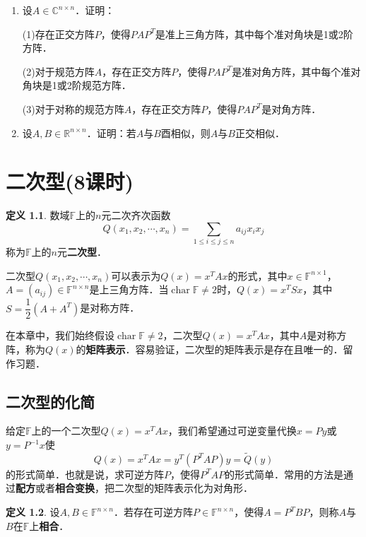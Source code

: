 \documentclass[a4paper,fontset=windows]{ctexbook}
\theoremstyle{definition}
\newtheorem{definition}{定义}[chapter]
\DeclareMathOperator{\Char}{char}
\renewcommand{\le}{\leqslant}
\begin{document}
\begin{enumerate}
\item 设$A\in\mathbb{C}^{n\times n}$．证明：

(1)存在正交方阵$P$，使得$PAP^T$是准上三角方阵，其中每个准对角块是1或2阶方阵．

(2)对于规范方阵$A$，存在正交方阵$P$，使得$PAP^T$是准对角方阵，其中每个准对角块是1或2阶规范方阵．

(3)对于对称的规范方阵$A$，存在正交方阵$P$，使得$PAP^T$是对角方阵．

\item 设$A,B\in\mathbb{R}^{n\times n}$．证明：若$A$与$B$酉相似，则$A$与$B$正交相似．

\end{enumerate}

\clearpage{}%

\chapter{二次型(8课时)}%

\begin{definition}
数域$\mathbb{F}$上的$n$元二次齐次函数
$$Q(x_1,x_2,\cdots,x_n)=\sum_{1\le i\le j\le n}a_{ij}x_ix_j$$
称为$\mathbb{F}$上的$n$元{\bf 二次型}．
\end{definition}

二次型$Q(x_1,x_2,\cdots,x_n)$可以表示为$Q(x)=x^TAx$的形式，其中$x\in\mathbb{F}^{n\times 1}$，$A=(a_{ij})\in\mathbb{F}^{n\times n}$是上三角方阵．当$\Char\mathbb{F}\ne 2$时，$Q(x)=x^TSx$，其中$S=\dfrac{1}{2}(A+A^T)$是对称方阵．

\medskip 在本章中，我们始终假设$\Char\mathbb{F}\ne 2$，二次型$Q(x)=x^TAx$，其中$A$是对称方阵，称为$Q(x)$的{\bf 矩阵表示}．容易验证，二次型的矩阵表示是存在且唯一的．留作习题．

\section{二次型的化简}

给定$\mathbb{F}$上的一个二次型$Q(x)=x^TAx$，我们希望通过可逆变量代换$x=Py$或$y=P^{-1}x$使
$$Q(x)=x^TAx=y^T(P^TAP)y=\widetilde{Q}(y)$$
的形式简单．也就是说，求可逆方阵$P$，使得$P^TAP$的形式简单．常用的方法是通过{\bf 配方}或者{\bf 相合变换}，把二次型的矩阵表示化为对角形．

\begin{definition}
设$A,B\in\mathbb{F}^{n\times n}$．若存在可逆方阵$P\in\mathbb{F}^{n\times n}$，使得$A=P^TBP$，则称$A$与$B$在$\mathbb{F}$上{\bf 相合}．
\end{definition}
\end{document}
